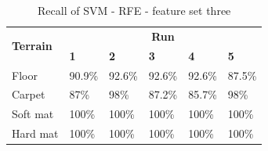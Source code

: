 \documentclass[USenglish]{ifimaster}  %
\begin{document}
	\begin{table}[h]\ContinuedFloat
	\begin{subtable}[h]{1\textwidth}
		\centering
		\captionsetup{justification=centering}
		\begin{tabular}{@{}llllll@{}}
			\toprule
			\multirow{2}{*}{\textbf{Terrain}} & \multicolumn{5}{c}{\textbf{Run}} \\ \cmidrule(l){2-6} 
			& \multicolumn{1}{l|}{\textbf{1}} & \multicolumn{1}{l|}{\textbf{2}} & \multicolumn{1}{l|}{\textbf{3}} & \multicolumn{1}{l|}{\textbf{4}} & \textbf{5} \\ \midrule
			\multicolumn{1}{l|}{Floor} & \multicolumn{1}{l|}{90.9\%} & \multicolumn{1}{l|}{92.6\%} & \multicolumn{1}{l|}{92.6\%} & \multicolumn{1}{l|}{92.6\%} & 87.5\% \\ \midrule
			\multicolumn{1}{l|}{Carpet} & \multicolumn{1}{l|}{87\%} & \multicolumn{1}{l|}{98\%} & \multicolumn{1}{l|}{87.2\%} & \multicolumn{1}{l|}{85.7\%} & 98\% \\ \midrule
			\multicolumn{1}{l|}{Soft mat} & \multicolumn{1}{l|}{100\%} & \multicolumn{1}{l|}{100\%} & \multicolumn{1}{l|}{100\%} & \multicolumn{1}{l|}{100\%} & 100\% \\ \midrule
			\multicolumn{1}{l|}{Hard mat} & \multicolumn{1}{l|}{100\%} & \multicolumn{1}{l|}{100\%} & \multicolumn{1}{l|}{100\%} & \multicolumn{1}{l|}{100\%} & 100\% \\ \bottomrule
		\end{tabular}
		\caption{Recall of SVM - RFE - feature set three}
		\label{recallsvm}
	\end{subtable}
\end{table}
\end{document}

